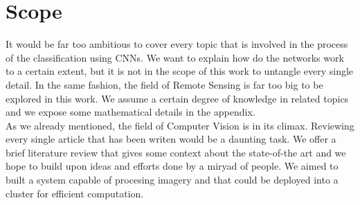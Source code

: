 \section{Scope}

It would be far too ambitious to cover every topic that is involved in the process of the classification using CNNs. We want to explain how do the networks work to a certain extent, but it is not in the scope of this work to untangle every single detail. In the same fashion, the field of Remote Sensing is far too big to be explored in this work. We assume a certain degree of knowledge in related topics and we expose some mathematical details in the appendix.\\

As we already mentioned, the field of Computer Vision is in its climax. Reviewing every single article that has been writen would be a daunting task. We offer a brief literature review that gives some context about the state-of-the art and we hope to build upon ideas and efforts done by a miryad of people. We aimed to built a system capable of procesing imagery and that could be deployed into a cluster for efficient computation.\\
